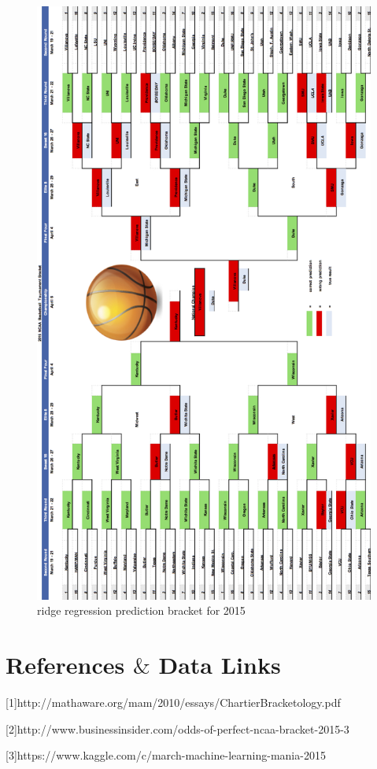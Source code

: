 \documentclass{article} %
\begin{document}
\begin{figure}[H]
\begin{center}
   \includegraphics[scale = 0.3]{bracket.jpg}

\caption{ridge regression prediction bracket for 2015}
\end{center}
\end{figure}


\section{References $\&$ Data Links}
[1]http://mathaware.org/mam/2010/essays/ChartierBracketology.pdf

[2]http://www.businessinsider.com/odds-of-perfect-ncaa-bracket-2015-3

[3]https://www.kaggle.com/c/march-machine-learning-mania-2015
\end{document}
